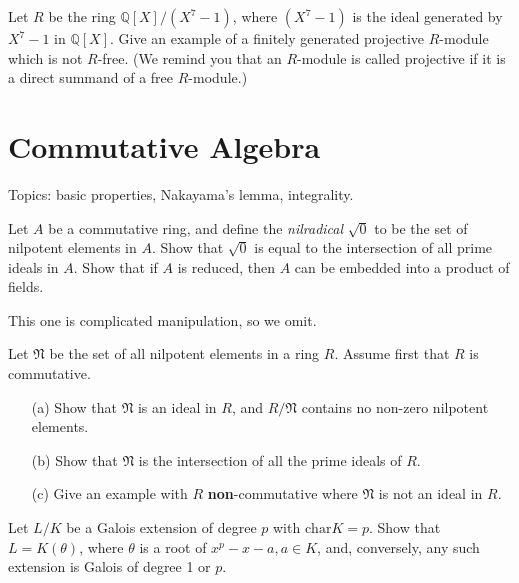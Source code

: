 \begin{prob}[F2000-Q6]
    Let \(R\) be the ring \(\mathbb{Q}[X]/(X^7-1)\), where \((X^7-1)\) is the ideal generated by \(X^7-1\) in \(\mathbb{Q}[X]\). Give an example of a finitely generated projective \(R\)-module which is not \(R\)-free. (We remind you that an \(R\)-module is called projective if it is a direct summand of a free \(R\)-module.)
\end{prob}










\chapter{Commutative Algebra}
Topics: basic properties, Nakayama's lemma, integrality.



\begin{prob}[S2017-Q1]
    Let \(A\) be a commutative ring, and define the \textit{nilradical} \(\sqrt{0}\) to be the set of nilpotent elements in \(A\). Show that \(\sqrt{0}\) is equal to the intersection of all prime ideals in \(A\). Show that if \(A\) is reduced, then \(A\) can be embedded into a product of fields.
\end{prob}
This one is complicated manipulation, so we omit.


\begin{prob}[F2004-Q2]
    Let \(\mathfrak{N}\) be the set of all nilpotent elements in a ring \(R\). Assume first that \(R\) is commutative.
    \begin{itemize}
        \item[(a)] Show that \(\mathfrak{N}\) is an ideal in \(R\), and \(R/\mathfrak{N}\) contains no non-zero nilpotent elements.
        \item[(b)] Show that \(\mathfrak{N}\) is the intersection of all the prime ideals of \(R\).
        \item[(c)] Give an example with \(R\) \textbf{non}-commutative where \(\mathfrak{N}\) is not an ideal in \(R\).
    \end{itemize}
\end{prob}

\begin{prob}[S2014-Q4]
    Let \(L/K\) be a Galois extension of degree \(p\) with \(\text{char}K=p\). Show that \(L=K(\theta)\), where \(\theta\) is a root of \(x^{p}-x-a,a\in K\), and, conversely, any such extension is Galois of degree 1 or \(p\).
\end{prob}





